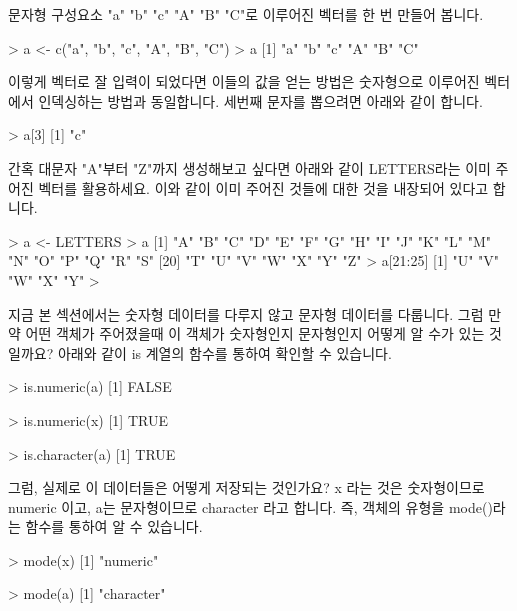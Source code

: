 문자형 구성요소 "a" "b" "c" "A" "B" "C"로 이루어진 벡터를 한 번 만들어 봅니다.

\begin{Schunk}
\begin{Soutput}
> a <- c("a", "b", "c", "A", "B", "C")
> a
[1] "a" "b" "c" "A" "B" "C"
\end{Soutput}
\end{Schunk}

이렇게 벡터로 잘 입력이 되었다면 이들의 값을 얻는 방법은 숫자형으로 이루어진 벡터에서 인덱싱하는 방법과 동일합니다. 
세번째 문자를 뽑으려면 아래와 같이 합니다. 

\begin{Schunk}
\begin{Soutput}
> a[3]
[1] "c"
\end{Soutput}
\end{Schunk}

간혹 대문자 "A"부터 "Z"까지 생성해보고 싶다면 아래와 같이 LETTERS라는 이미 주어진 벡터를 활용하세요.
이와 같이 이미 주어진 것들에 대한 것을 내장되어 있다고 합니다. 


\begin{Schunk}
\begin{Soutput}
> a <- LETTERS
> a
 [1] "A" "B" "C" "D" "E" "F" "G" "H" "I" "J" "K" "L" "M" "N" "O" "P" "Q" "R" "S"
[20] "T" "U" "V" "W" "X" "Y" "Z"
> a[21:25]
[1] "U" "V" "W" "X" "Y"
> 
\end{Soutput}
\end{Schunk}

지금 본 섹션에서는 숫자형 데이터를 다루지 않고 문자형 데이터를 다룹니다. 
그럼 만약 어떤 객체가 주어졌을때 이 객체가 숫자형인지 문자형인지 어떻게 알 수가 있는 것일까요?
아래와 같이 is 계열의 함수를 통하여 확인할 수 있습니다. 

\begin{Schunk}
\begin{Soutput}
> is.numeric(a)
[1] FALSE

> is.numeric(x)
[1] TRUE

> is.character(a)
[1] TRUE
\end{Soutput}
\end{Schunk}

그럼, 실제로 이 데이터들은 어떻게 저장되는 것인가요? x 라는 것은 숫자형이므로 numeric 이고, a는 문자형이므로 character 라고 합니다. 
즉, 객체의 유형을 mode()라는 함수를 통하여 알 수 있습니다.  

\begin{Schunk}
\begin{Soutput}
> mode(x)
[1] "numeric"

> mode(a)
[1] "character"

\end{Soutput}
\end{Schunk}

